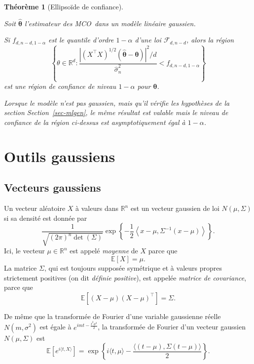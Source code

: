 \documentclass[
  10,
  letterpaper,
  DIV=11,
  numbers=noendperiod]{scrreport}
\newcommand{\bt}{\boldsymbol{\theta}}
\theoremstyle{plain}
\newtheorem{theorem}{Théorème}[chapter]
\theoremstyle{definition}
\theoremstyle{plain}
\theoremstyle{definition}
\theoremstyle{definition}
\theoremstyle{plain}
\theoremstyle{remark}
\begin{document}
\begin{theorem}[Ellipsoïde de
confiance]\protect\hypertarget{thm-ellipse}{}\label{thm-ellipse}

Soit \(\hat{\bt}\) l'estimateur des MCO~dans un modèle linéaire
gaussien.

Si \(f_{d,n-d,1-\alpha}\) est le quantile d'ordre \(1-\alpha\) d'une loi
\(\mathscr{F}_{d,n-d}\), alors la région
\[ \left\lbrace \theta \in \mathbb{R}^d : \frac{|(X^\top X)^{1/2}(\hat{\bt} - \bt) |^2 / d}{\hat{\sigma}_n^2 } <  f_{d,n-d,1-\alpha} \right\rbrace \]
est une région de confiance de niveau \(1-\alpha\) pour \(\bt\).

Lorsque le modèle n'est pas gaussien, mais qu'il vérifie les hypothèses
de la section Section~\ref{sec-mlgen}, le même résultat est valable mais
le niveau de confiance de la région ci-dessus est
\emph{asymptotiquement} égal à \(1-\alpha\).

\end{theorem}


\hypertarget{outils-gaussiens}{%
\chapter{Outils gaussiens}\label{outils-gaussiens}}

\hypertarget{vecteurs-gaussiens}{%
\section{Vecteurs gaussiens}\label{vecteurs-gaussiens}}

Un vecteur aléatoire \(X\) à valeurs dans \(\mathbb{R}^n\) est un
vecteur gaussien de loi \(N(\mu,\Sigma)\) si sa densité est donnée par
\[ \frac{1}{\sqrt{(2\pi)^n \det(\Sigma)}}\exp\left\lbrace - \frac{1}{2}\left\langle x-\mu, \Sigma^{-1}(x-\mu)\right\rangle \right\rbrace.\]
Ici, le vecteur \(\mu \in \mathbb{R}^n\) est appelé \emph{moyenne} de
\(X\) parce que \[\mathbb{E}[X] = \mu. \] La matrice \(\Sigma\), qui est
toujours supposée symétrique et à valeurs propres strictement positives
(on dit \emph{définie positive}), est appelée \emph{matrice de
covariance}, parce que \[\mathbb{E}[(X-\mu)(X-\mu)^\top] = \Sigma. \]

De même que la transformée de Fourier d'une variable gaussienne réelle
\(N(m, \sigma^2)\) est égale à \(e^{imt - \frac{t^2\sigma^2}{2}}\), la
transformée de Fourier d'un vecteur gaussien \(N(\mu,\Sigma)\) est
\[\mathbb{E}[e^{i\langle t, X\rangle}] = \exp\left\lbrace i\langle t, \mu\rangle - \frac{\langle(t-\mu), \Sigma (t-\mu) \rangle}{2} \right\rbrace. \]
\end{document}
